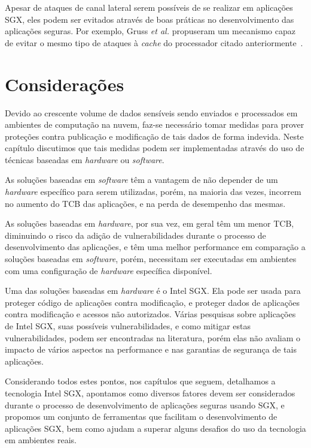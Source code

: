 Apesar de ataques de canal lateral serem possíveis de se realizar em aplicações
SGX, eles podem ser evitados através de boas práticas no desenvolvimento das
aplicações seguras. Por exemplo, Gruss \textit{et al.} propuseram um mecanismo
capaz de evitar o mesmo tipo de ataques à \textit{cache} do processador citado
anteriormente~\cite{gruss2017strong}.

\section{Considerações}
\label{sec:estadoarte_consideracoes_finais}

Devido ao crescente volume de dados sensíveis sendo enviados e processados em
ambientes de computação na nuvem, faz-se necessário tomar medidas para prover
proteções contra publicação e modificação de tais dados de forma indevida. Neste
capítulo discutimos que tais medidas podem ser implementadas através do uso de
técnicas baseadas em \textit{hardware} ou \textit{software}.

As soluções baseadas em \textit{software} têm a vantagem de não depender de um
\textit{hardware} específico para serem utilizadas, porém, na maioria das vezes,
incorrem no aumento do TCB das aplicações, e na perda de desempenho das mesmas.

As soluções baseadas em \textit{hardware}, por sua vez, em geral têm um menor
TCB, diminuindo o risco da adição de vulnerabilidades durante o processo de
desenvolvimento das aplicações, e têm uma melhor performance em comparação a
soluções baseadas em \textit{software}, porém, necessitam ser executadas em
ambientes com uma configuração de \textit{hardware} específica disponível.

Uma das soluções baseadas em \textit{hardware} é o Intel SGX. Ela pode ser usada
para proteger código de aplicações contra modificação, e proteger dados de
aplicações contra modificação e acessos não autorizados. Várias pesquisas sobre
aplicações de Intel SGX, suas possíveis vulnerabilidades, e como mitigar estas
vulnerabilidades, podem ser encontradas na literatura, porém elas não avaliam o
impacto de vários aspectos na performance e nas garantias de segurança de tais
aplicações.

Considerando todos estes pontos, nos capítulos que seguem, detalhamos a
tecnologia Intel SGX, apontamos como diversos fatores devem ser considerados
durante o processo de desenvolvimento de aplicações seguras usando SGX, e
propomos um conjunto de ferramentas que facilitam o desenvolvimento de
aplicações SGX, bem como ajudam a superar alguns desafios do uso da tecnologia
em ambientes reais.